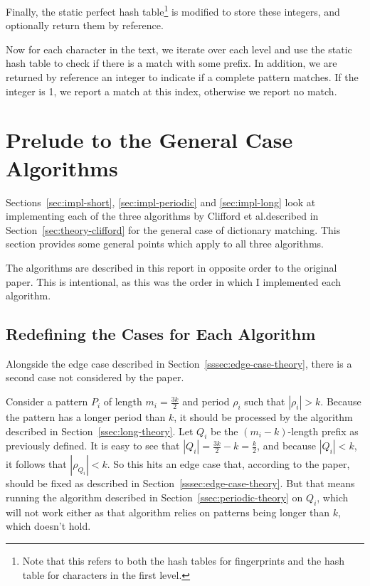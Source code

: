 \documentclass[ %
                    author={Dominic Joseph Moylett},
                    degree={MEng},
                     title={Dictionary Matching with Fingerprints},
                  subtitle={An Empirical Analysis},
                      type={research},
                      year={2015} ]{dissertation}
\begin{document}
Finally, the static perfect hash table\footnote{Note that this refers to both the hash tables for fingerprints and the hash table for characters in the first level.} is modified to store these integers, and optionally return them by reference.

Now for each character in the text, we iterate over each level and use the static hash table to check if there is a match with some prefix. In addition, we are returned by reference an integer to indicate if a complete pattern matches. If the integer is 1, we report a match at this index, otherwise we report no match.

\section{Prelude to the General Case Algorithms}

Sections~\ref{sec:impl-short}, \ref{sec:impl-periodic} and \ref{sec:impl-long} look at implementing each of the three algorithms by Clifford et al.\@ described in Section~\ref{sec:theory-clifford} for the general case of dictionary matching. This section provides some general points which apply to all three algorithms.

The algorithms are described in this report in opposite order to the original paper. This is intentional, as this was the order in which I implemented each algorithm.

\subsection{Redefining the Cases for Each Algorithm}
\label{ssec:case-redefine}

Alongside the edge case described in Section~\ref{sssec:edge-case-theory}, there is a second case not considered by the paper.

Consider a pattern $P_i$ of length $m_i = \frac{3k}{2}$ and period $\rho_i$ such that $|\rho_i| > k$. Because the pattern has a longer period than $k$, it should be processed by the algorithm described in Section~\ref{ssec:long-theory}. Let $Q_i$ be the $(m_i - k)$-length prefix as previously defined. It is easy to see that $|Q_i| = \frac{3k}{2} - k = \frac{k}{2}$, and because $|Q_i| < k$, it follows that $|\rho_{Q_i}| < k$. So this hits an edge case that, according to the paper, should be fixed as described in Section~\ref{sssec:edge-case-theory}. But that means running the algorithm described in Section~\ref{ssec:periodic-theory} on $Q_i$, which will not work either as that algorithm relies on patterns being longer than $k$, which doesn't hold.
\end{document}

